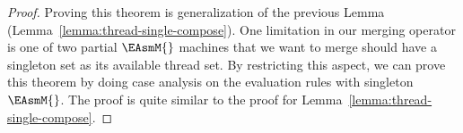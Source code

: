 \begin{proof}
Proving this theorem is generalization of the previous Lemma (Lemma~\ref{lemma:thread-single-compose}). 
One limitation in our merging operator is one of two partial $\EAsmM{}$ machines that we want to merge should have a singleton set as its available thread set. 
By restricting this aspect, we can 
prove this theorem by doing case analysis on the evaluation rules with singleton $\EAsmM{}$.
The proof is quite similar to the proof for Lemma~\ref{lemma:thread-single-compose}.
\end{proof}


